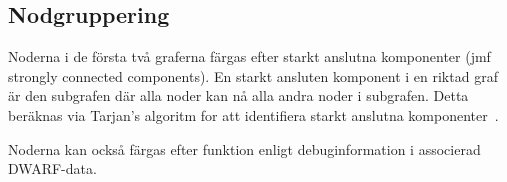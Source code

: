 \subsection{Nodgruppering}

Noderna i de första två graferna färgas efter starkt anslutna komponenter (jmf
strongly connected components). En starkt ansluten komponent i en riktad graf är
den subgrafen där alla noder kan nå alla andra noder i subgrafen. Detta beräknas
via Tarjan's algoritm for att identifiera starkt anslutna
komponenter~\cite{tarjan}.

Noderna kan också färgas efter funktion enligt debuginformation i associerad
DWARF-data.

